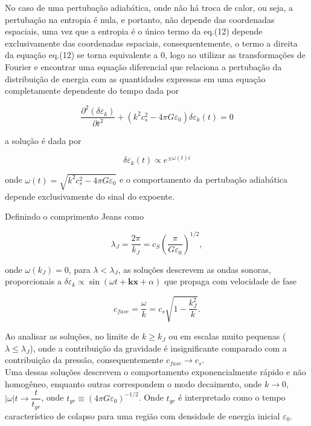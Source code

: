 No caso de uma pertubação adiabática, onde não há troca de calor, ou seja, a pertubação na entropia é nula, e portanto, não depende das coordenadas espaciais, uma vez que a entropia é o único termo da eq.(12) depende exclusivamente das coordenadas espaciais, consequentemente, o termo a direita da equação eq.(12) se torna equivalente a 0, logo ao utilizar as transformações de Fourier e encontrar uma equação diferencial que relaciona a pertubação da distribuição de energia com as quantidades expressas em uma equação completamente dependente do tempo dada por 

\begin{equation}\label{eq13}
	\dfrac{\partial^2 (\delta\varepsilon_k )}{\partial t^2} +(k^2c^2_s - 4\pi G\varepsilon_0)\delta\varepsilon_k (t) = 0
\end{equation}

a solução é dada por 

\begin{equation}\label{eq14}
	\delta\varepsilon_k (t) \propto e^{\pm \omega (t) i}
\end{equation}

onde $\omega (t) = \sqrt{k^2c^2_s - 4\pi G \varepsilon_0}$ e o comportamento da pertubação adiabática depende exclusivamente do sinal do expoente.

Definindo o comprimento Jeans como

\begin{equation}\label{eq15}
	\lambda_J = \dfrac{2\pi}{k_J} = c_S \left(\dfrac{\pi}{G\varepsilon_0} \right)^{1/2},
\end{equation}

onde $\omega (k_J) = 0$, para  $\lambda < \lambda_J$, as soluções descrevem as ondas sonoras, proporcionais a $ \delta\varepsilon_k \propto \sin (\omega t + \mathbf{k}\mathbf{x} + \alpha) $ que propaga com velocidade de fase 

\begin{equation}\label{eq16}
	c_{fase} = \dfrac{\omega}{k}= c_s\sqrt{1 - \dfrac{k^2_J}{k}}.
\end{equation}

Ao analisar as soluções, no limite de $k \geq k_J$ ou em escalas muito pequenas ($\lambda \leq \lambda_J$), onde a contribuição da gravidade é insignificante comparado com a contribuição da pressão, consequentemente $c_{fase} \to c_s$.\\

Uma dessas soluções descrevem o comportamento exponencialmente rápido e não homogêneo, enquanto outras correspondem o modo decaimento, onde $k \to 0$, $|\omega | t \to \dfrac{t}{t_{gr}}$, onde $t_{gr} \equiv (4\pi G\varepsilon_0)^{-1/2}$. Onde $t_{gr}$ é interpretado como o tempo característico de colapso para uma região com densidade de energia inicial $\varepsilon_0$.

